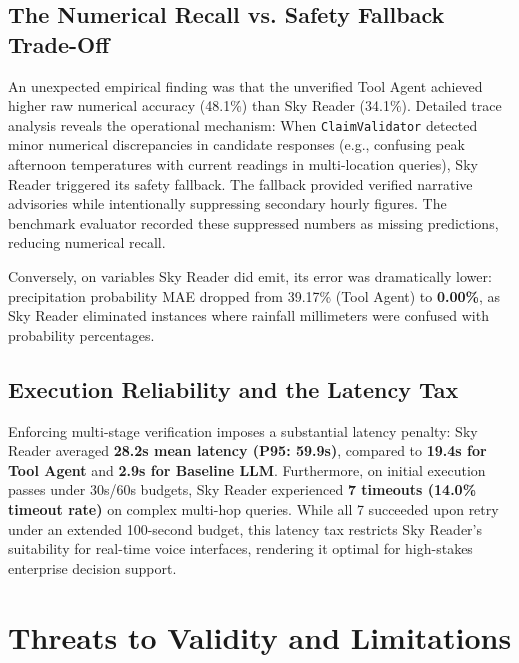 \documentclass[conference]{IEEEtran}
\begin{document}
\subsection{The Numerical Recall vs. Safety Fallback Trade-Off}
An unexpected empirical finding was that the unverified Tool Agent achieved higher raw numerical accuracy (48.1\%) than Sky Reader (34.1\%). Detailed trace analysis reveals the operational mechanism:
When \texttt{ClaimValidator} detected minor numerical discrepancies in candidate responses (e.g., confusing peak afternoon temperatures with current readings in multi-location queries), Sky Reader triggered its safety fallback. The fallback provided verified narrative advisories while intentionally suppressing secondary hourly figures. The benchmark evaluator recorded these suppressed numbers as missing predictions, reducing numerical recall.

Conversely, on variables Sky Reader did emit, its error was dramatically lower: precipitation probability MAE dropped from 39.17\% (Tool Agent) to \textbf{0.00\%}, as Sky Reader eliminated instances where rainfall millimeters were confused with probability percentages.

\subsection{Execution Reliability and the Latency Tax}
Enforcing multi-stage verification imposes a substantial latency penalty: Sky Reader averaged \textbf{28.2s mean latency (P95: 59.9s)}, compared to \textbf{19.4s for Tool Agent} and \textbf{2.9s for Baseline LLM}. Furthermore, on initial execution passes under 30s/60s budgets, Sky Reader experienced \textbf{7 timeouts (14.0\% timeout rate)} on complex multi-hop queries. While all 7 succeeded upon retry under an extended 100-second budget, this latency tax restricts Sky Reader's suitability for real-time voice interfaces, rendering it optimal for high-stakes enterprise decision support.

\section{Threats to Validity and Limitations}
\end{document}
